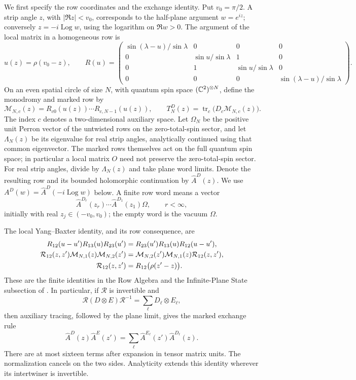 We first specify the row coordinates and the exchange identity.  Put
$v_0=\pi/2$.  A strip angle $z$, with $|\Re z|<v_0$, corresponds to
the half-plane argument $w=e^{iz}$; conversely
$z=-i\operatorname{Log}w$, using the logarithm on $\Re w>0$.
The argument of the local matrix in a homogeneous row is
\[
 u(z)=\rho(v_0-z),\qquad
 R(u)=\begin{pmatrix}
 \sin(\lambda-u)/\sin\lambda&0&0&0\\
 0&\sin u/\sin\lambda&1&0\\
 0&1&\sin u/\sin\lambda&0\\
 0&0&0&\sin(\lambda-u)/\sin\lambda
 \end{pmatrix}.
\]
On an even spatial circle of size $N$, with quantum spin space
$(\mathbb C^2)^{\otimes N}$, define the monodromy and marked row by
\[
 \mathcal M_{N,c}(z)=R_{c0}(u(z))\cdots R_{c,N-1}(u(z)),\qquad
 T_N^D(z)=\operatorname{tr}_c\bigl(D_c\mathcal M_{N,c}(z)\bigr).
\]
The index $c$ denotes a two-dimensional auxiliary space.  Let
$\Omega_N$ be the positive unit Perron vector of the untwisted
rows on the zero-total-spin sector, and let $\Lambda_N(z)$ be
its eigenvalue for real strip angles, analytically continued
using that common eigenvector.  The marked rows themselves act
on the full quantum spin space; in particular a local matrix
$O$ need not preserve the zero-total-spin sector.
For real strip angles, divide by $\Lambda_N(z)$ and take plane
word limits.  Denote the resulting row and its bounded holomorphic
continuation by $\widehat A^D(z)$.  We use
$A^D(w)=\widehat A^D(-i\operatorname{Log}w)$ below.  A finite row
word means a vector
\[
 \widehat A^{D_r}(z_r)\cdots\widehat A^{D_1}(z_1)\Omega,
 \qquad r<\infty,
\]
initially with real $z_j\in(-v_0,v_0)$; the empty word is the
vacuum $\Omega$.

The local Yang--Baxter identity, and its row consequence, are
\begin{align}
 R_{12}(u-u')R_{13}(u)R_{23}(u')
 &=R_{23}(u')R_{13}(u)R_{12}(u-u'),\notag\\
 \mathcal R_{12}(z,z')\mathcal M_{N,1}(z)\mathcal M_{N,2}(z')
 &=\mathcal M_{N,2}(z')\mathcal M_{N,1}(z)
       \mathcal R_{12}(z,z'),\label{eq:row-exchange}\\
 \mathcal R_{12}(z,z')&=R_{12}\bigl(\rho(z'-z)\bigr).\notag
\end{align}
These are the finite identities in the Row Algebra and the
Infinite-Plane State subsection of \cite{FKCompanion}.
In particular, if $\mathcal R$ is invertible and
\[
 \mathcal R(D\otimes E)\mathcal R^{-1}
 =\sum_\ell D_\ell\otimes E_\ell,
\]
then auxiliary tracing, followed by the plane limit, gives the
marked exchange rule
\begin{equation}\label{eq:marked-row-exchange}
 \widehat A^D(z)\widehat A^E(z')
 =\sum_\ell\widehat A^{E_\ell}(z')\widehat A^{D_\ell}(z).
\end{equation}
There are at most sixteen terms after expansion in tensor matrix
units.  The normalization cancels on the two sides.  Analyticity
extends this identity wherever its intertwiner is invertible.

